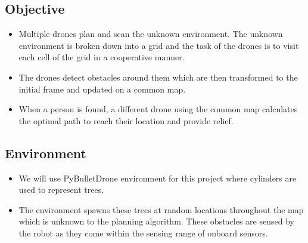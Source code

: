 \subsection{Objective}
\begin{itemize}
    \item Multiple drones plan and scan the unknown environment. The unknown environment is broken down into a grid and the task of the drones is to visit each cell of the grid in a cooperative manner.
    \item The drones detect obstacles around them which are then transformed to the initial frame and updated on a common map.
    \item When a person is found, a different drone using the common map calculates the optimal path to reach their location and provide relief.
\end{itemize}

\subsection{Environment}
\begin{itemize}
    \item We will use PyBulletDrone environment for this project where cylinders are used to represent trees.
    \item The environment spawns these trees at random locations throughout the map which is unknown to the planning algorithm. These obstacles are sensed by the robot as they come within the sensing range of onboard sensors.
\end{itemize}

